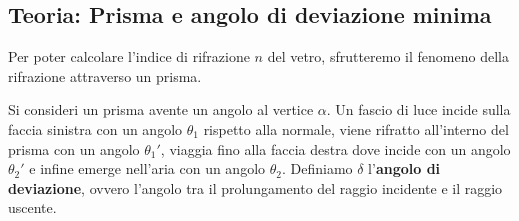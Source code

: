 \documentclass[openany,a4paper,12pt]{book}
\begin{document}
\subsection*{Teoria: Prisma e angolo di deviazione minima}
Per poter calcolare l'indice di rifrazione $n$ del vetro, sfrutteremo il fenomeno della rifrazione attraverso un prisma. 

Si consideri un prisma avente un angolo al vertice $\alpha$. Un fascio di luce incide sulla faccia sinistra con un angolo $\theta_1$ rispetto alla normale, viene rifratto all'interno del prisma con un angolo $\theta_1'$, viaggia fino alla faccia destra dove incide con un angolo $\theta_2'$ e infine emerge nell'aria con un angolo $\theta_2$.
Definiamo $\delta$ l'\textbf{angolo di deviazione}, ovvero l'angolo tra il prolungamento del raggio incidente e il raggio uscente.
\end{document}
